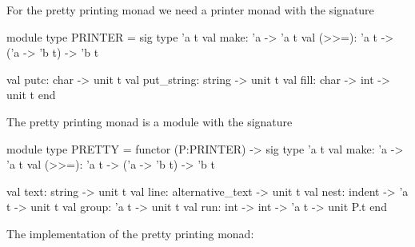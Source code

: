 \documentclass[12pt]{article}
\begin{document}
For the pretty printing monad we need a printer monad with the signature
\begin{ocaml}
module type PRINTER =
  sig
    type 'a t
    val make: 'a -> 'a t
    val (>>=): 'a t -> ('a -> 'b t) -> 'b t

    val putc: char -> unit t
    val put_string: string -> unit t
    val fill: char -> int -> unit t
  end
\end{ocaml}
%
%
The pretty printing monad is a module with the signature
\begin{ocaml}
module type PRETTY =
  functor (P:PRINTER) ->
  sig
    type 'a t
    val make: 'a -> 'a t
    val (>>=): 'a t -> ('a -> 'b t) -> 'b t

    val text: string -> unit t
    val line: alternative_text -> unit t
    val nest: indent -> 'a t -> unit t
    val group: 'a t -> unit t
    val run:  int -> int -> 'a t -> unit P.t
  end

\end{ocaml}
%
%
The implementation of the pretty printing monad:
\end{document}
